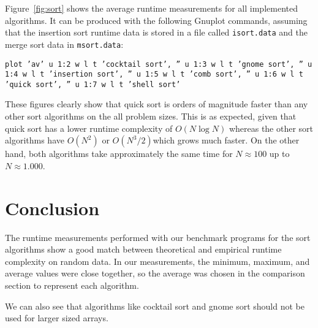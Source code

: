 \documentclass[a4paper,10pt]{article}
\begin{document}
Figure~\ref{fig:sort} shows the average runtime measurements for all implemented algorithms.
It can be produced with the following Gnuplot commands, assuming that the insertion sort runtime data is stored in a file called \texttt{isort.data} and the merge sort data in \texttt{msort.data}:


\smallskip
\texttt{plot 'av' u 1:2 w l t 'cocktail sort', '' u 1:3 w l t 'gnome sort', '' u 1:4 w l t 'insertion sort', '' u 1:5 w l t 'comb sort', '' u 1:6 w l t 'quick sort', '' u 1:7 w l t 'shell sort'}
\smallskip


These figures clearly show that quick sort is orders of magnitude faster than any other sort algorithms on the all problem sizes.
This is as expected, given that quick sort has a lower runtime complexity of $O(N \log N)$ whereas the other sort algorithms have $O(N^2)$ or $O(N^3/2)$which grows much faster.
On the other hand, both algorithms take approximately the same time for $N\approx 100$ up to  $N\approx 1.000$.


\section*{Conclusion}

The runtime measurements performed with our benchmark programs for the sort algorithms show a good match between theoretical and empirical runtime complexity on random data.
In our measurements, the minimum, maximum, and average values were close together, so the average was chosen in the comparison section to represent each algorithm.

We can also see that algorithms like cocktail sort and gnome sort should not be used for larger sized arrays.
\end{document}
